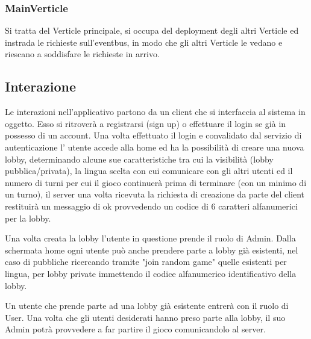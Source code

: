 \subsubsection{MainVerticle}
Si tratta del Verticle principale, si occupa del deployment degli altri Verticle ed instrada le richieste sull'eventbus, in modo che gli altri Verticle le vedano e riescano a soddisfare le richieste in arrivo.

\subsection{Interazione}
Le interazioni nell'applicativo partono da un client che si interfaccia al sistema in oggetto. Esso si ritroverà a registrarsi (sign up) o effettuare il login se già in possesso di un account. Una volta effettuato il login e convalidato dal servizio di autenticazione l' utente accede alla home ed ha la possibilità di creare una nuova lobby, determinando alcune sue caratteristiche tra cui la visibilità (lobby pubblica/privata), la lingua scelta con cui comunicare con gli altri utenti ed il numero di turni per cui il gioco continuerà prima di terminare (con un minimo di un turno), il server una volta ricevuta la richiesta di creazione da parte del client restituirà un messaggio di ok provvedendo un codice di 6 caratteri alfanumerici per la lobby. \newline

\noindent Una volta creata la lobby l'utente in questione prende il ruolo di Admin. Dalla schermata home ogni utente può anche prendere parte a lobby già esistenti, nel caso di pubbliche ricercando tramite "join random game" quelle esistenti per lingua, per lobby private immettendo il codice alfanumerico identificativo della lobby. \newline

\noindent Un utente che prende parte ad una lobby già esistente entrerà con il ruolo di User. Una volta che gli utenti desiderati hanno preso parte alla lobby, il suo Admin potrà provvedere a far partire il gioco comunicandolo al server.\newline

